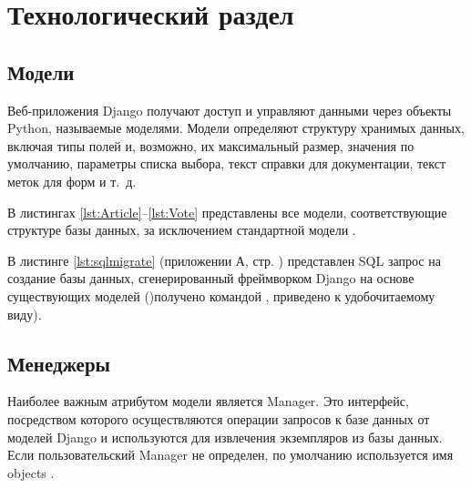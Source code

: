 \chapter{Технологический раздел}

\section{Модели}

Веб-приложения Django получают доступ и управляют данными через объекты Python, называемые моделями.
Модели определяют структуру хранимых данных, включая типы полей и, возможно, их максимальный размер, значения по умолчанию, параметры списка выбора, текст справки для документации, текст меток для форм и т.~д.

В листингах \ref{lst:Article}–\ref{lst:Vote} представлены все модели, соответствующие структуре базы данных, за исключением стандартной модели .









В листинге \ref{lst:sqlmigrate} (приложении А, стр. \pageref{chp:attachment-a}) представлен SQL запрос на создание базы данных, сгенерированный фреймворком Django на основе существующих моделей ()получено командой , приведено к удобочитаемому виду).

\section{Менеджеры}

Наиболее важным атрибутом модели является Manager.
Это интерфейс, посредством которого осуществляются операции запросов к базе данных от моделей Django и используются для извлечения экземпляров из базы данных.
Если пользовательский Manager не определен, по умолчанию используется имя objects \cite{django-mozilla}.

